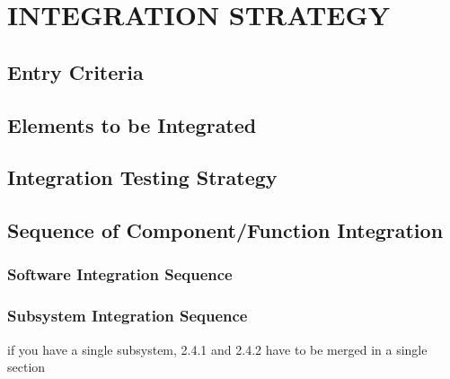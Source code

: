 \section{INTEGRATION STRATEGY}
\subsection{Entry Criteria}
\subsection{Elements to be Integrated}
\subsection{Integration Testing Strategy}
\subsection{Sequence of Component/Function Integration}
\subsubsection{Software Integration Sequence}
\subsubsection{Subsystem Integration Sequence} if you have a single subsystem, 2.4.1 and 2.4.2 have to be merged in a single section





